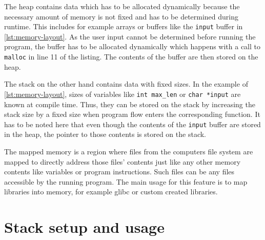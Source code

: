 The heap contains data which has to be allocated dynamically because the necessary amount of memory is not fixed and has to be determined during runtime.
This includes for example arrays or buffers like the \texttt{input} buffer in \cref{lst:memory-layout}.
As the user input cannot be determined before running the program, the buffer has to be allocated dynamically which happens with a call to \texttt{malloc} in line 11 of the listing.
The contents of the buffer are then stored on the heap.

The stack on the other hand contains data with fixed sizes.
In the example of \cref{lst:memory-layout}, sizes of variables like \texttt{int max\_len} or \texttt{char *input} are known at compile time.
Thus, they can be stored on the stack by increasing the stack size by a fixed size when program flow enters the corresponding function.
It has to be noted here that even though the contents of the \texttt{input} buffer are stored in the heap, the pointer to those contents is stored on the stack.

The mapped memory is a region where files from the computers file system are mapped to directly address those files' contents just like any other memory contents like variables or program instructions.
Such files can be any files accessible by the running program.
The main usage for this feature is to map libraries into memory, for example \gls{glibc} or custom created libraries.



\section{Stack setup and usage}
\label{sec:stack-setup-and-usage}

